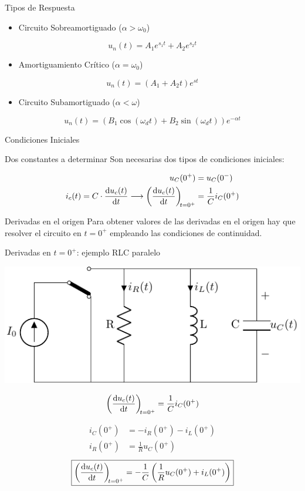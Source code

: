\documentclass[aspectratio=169, usenames,svgnames,dvipsnames]{beamer}
\begin{document}
\begin{frame}[label={sec:org8390dc2}]{Tipos de Respuesta}
\begin{itemize}
\item Circuito Sobreamortiguado (\(\alpha > \omega_0\))
\end{itemize}
\[
  \boxed{u_n(t) = A_1 e^{s_1 t} + A_2 e^{s_2 t}}
\]
\begin{itemize}
\item Amortiguamiento Crítico (\(\alpha = \omega_0\))
\end{itemize}
\[
  \boxed{u_n(t) = (A_1 + A_2 t) e^{s t} }
\]

\begin{itemize}
\item Circuito Subamortiguado (\(\alpha < \omega\))
\end{itemize}
\[
  \boxed{u_n(t) = (B_1\cos(\omega_d t) + B_2\sin(\omega_d t)) e^{-\alpha t}}
\]
\end{frame}
\begin{frame}[label={sec:orgc7b8e61}]{Condiciones Iniciales}
\begin{block}{Dos constantes a determinar}
Son necesarias dos tipos de condiciones iniciales:


\begin{align*}
  u_C(0^+) &= u_C(0^-)\\
  i_c(t) = C \cdot \diff{u_c(t)}{t} \longrightarrow \diff{u_c(t)}{t}[t = 0^+] &= \frac{1}{C}i_C(0^+)
\end{align*}
\end{block}
\begin{block}{Derivadas en el origen}
Para obtener valores de las derivadas en el origen hay que resolver el circuito en \(t = 0^+\) empleando las condiciones de continuidad.
\end{block}
\end{frame}
\begin{frame}[label={sec:org52f8c10}]{Derivadas en \(t = 0^+\): ejemplo RLC paralelo}
\begin{center}
\includegraphics[height=0.25\textheight]{../figs/transitorio_circuitoRLC_paralelo_t0+.pdf}
\end{center}

\[
  \diff{u_c(t)}{t}[t = 0^+] = \frac{1}{C}i_C(0^+)
\]

\begin{align*}
  i_C(0^+) &= -i_R(0^+) - i_L(0^+)\\
  i_R(0^+) &= \frac{1}{R} u_C(0^+)
\end{align*}
\[
  \boxed{\diff{u_c(t)}{t}[t = 0^+] = - \frac{1}{C} \left( \frac{1}{R} u_C(0^+) +  i_L(0^+)\right)}
\]
\end{frame}
\end{document}
